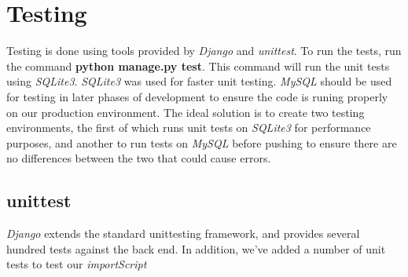 \documentclass[12pt]{report}
\begin{document}
\newpage
\section*{Testing}
Testing is done using tools provided by \emph{Django} and \emph{unittest}.
To run the tests, run the command \textbf{python manage.py test}.
This command will run the unit tests using \emph{SQLite3}.
\emph{SQLite3} was used for faster unit testing.
\emph{MySQL} should be used for testing in later phases of development to ensure the code is runing properly on our production environment.
The ideal solution is to create two testing environments, the first of which runs unit tests on \emph{SQLite3} for performance purposes,
and another to run tests on \emph{MySQL} before pushing to ensure there are no differences between the two that could cause errors.

\subsection*{unittest}
\emph{Django} extends the standard unittesting framework, and provides several hundred tests against the back end.
In addition, we've added a number of unit tests to test our \emph{importScript}
\end{document}
